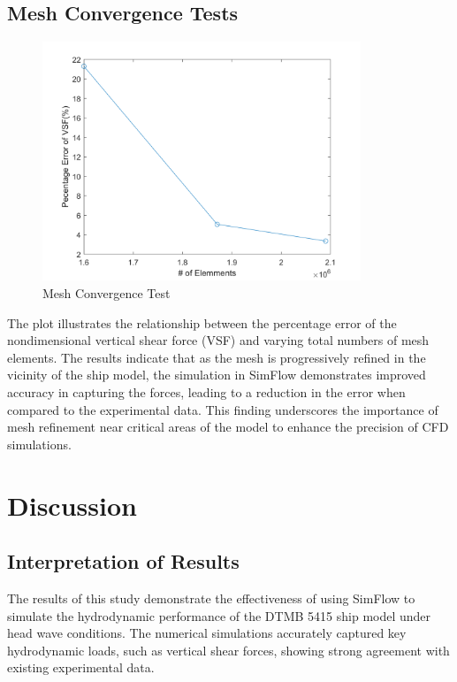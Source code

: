 \documentclass[12pt]{article} %
\begin{document}
\subsection{Mesh Convergence Tests}
\begin{figure}[ht]
    \centering
    \includegraphics[width=0.85\textwidth]{MCT.png}
    \caption{Mesh Convergence Test}
\end{figure}
The plot illustrates the relationship between the percentage error of the nondimensional vertical shear 
force (VSF) and varying total numbers of mesh elements.
The results indicate that as the mesh is progressively refined in the vicinity of the ship model, the 
simulation in SimFlow demonstrates improved accuracy in capturing the forces, leading to a reduction 
in the error when compared to the experimental data. This finding underscores the importance of mesh 
refinement near critical areas of the model to enhance the precision of CFD simulations.  

\clearpage
\section{Discussion}

\subsection{Interpretation of Results}
The results of this study demonstrate the effectiveness of using SimFlow to simulate the 
hydrodynamic performance of the DTMB 5415 ship model under head wave conditions. The numerical 
simulations accurately captured key hydrodynamic loads, such as vertical shear forces, showing strong 
agreement with existing experimental data. 
\end{document}
